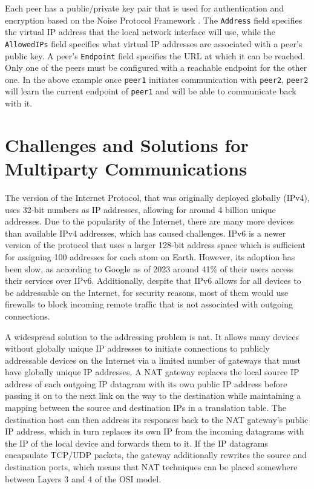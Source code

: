 Each peer has a public/private key pair that is used for authentication and encryption based on the Noise Protocol Framework \autocite{noiseDocs}. The \texttt{Address} field specifies the virtual IP address that the local network interface will use, while the \texttt{AllowedIPs} field specifies what virtual IP addresses are associated with a peer's public key. A peer's \texttt{Endpoint} field specifies the URL at which it can be reached. Only one of the peers must be configured with a reachable endpoint for the other one. In the above example once \texttt{peer1} initiates communication with \texttt{peer2}, \texttt{peer2} will learn the current endpoint of \texttt{peer1} and will be able to communicate back with it.


\section{Challenges and Solutions for Multiparty Communications}\label{thesis__020-internet.md__challenges-and-solutions-for-multiparty-communications}

The version of the Internet Protocol, that was originally deployed globally (IPv4), uses 32-bit numbers as IP addresses, allowing for around 4 billion unique addresses. Due to the popularity of the Internet, there are many more devices than available IPv4 addresses, which has caused challenges. IPv6 is a newer version of the protocol that uses a larger 128-bit address space which is sufficient for assigning 100 addresses for each atom on Earth. However, its adoption has been slow, as according to Google\autocite{IPv6Google} as of 2023 around 41\% of their users access their services over IPv6. Additionally, despite that IPv6 allows for all devices to be addressable on the Internet, for security reasons, most of them would use firewalls to block incoming remote traffic that is not associated with outgoing connections.

A widespread solution to the addressing problem is \gls{nat}. It allows many devices without globally unique IP addresses to initiate connections to publicly addressable devices on the Internet via a limited number of gateways that must have globally unique IP addresses. A NAT gateway replaces the local source IP address of each outgoing IP datagram with its own public IP address before passing it on to the next link on the way to the destination while maintaining a mapping between the source and destination IPs in a translation table. The destination host can then address its responses back to the NAT gateway's public IP address, which in turn replaces its own IP from the incoming datagrams with the IP of the local device and forwards them to it. If the IP datagrams encapsulate TCP/UDP packets, the gateway additionally rewrites the source and destination ports, which means that NAT techniques can be placed somewhere between Layers 3 and 4 of the OSI model.

